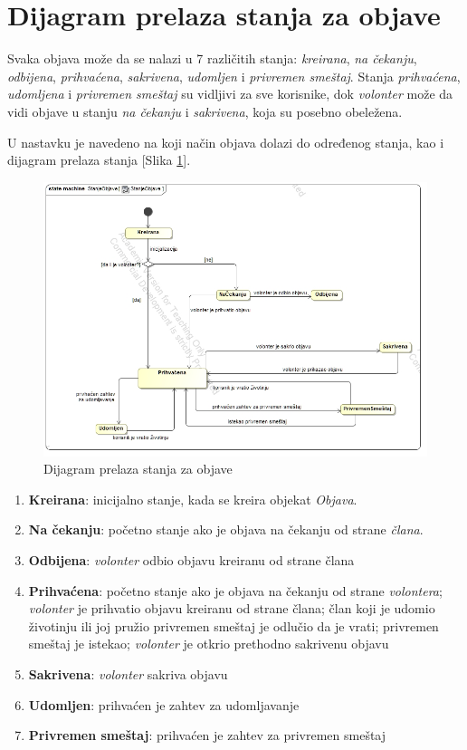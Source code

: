 \section{Dijagram prelaza stanja za objave}
\par Svaka objava može da se nalazi u 7 različitih stanja: \textit{kreirana}, \textit{na čekanju}, \textit{odbijena},
\textit{prihvaćena}, \textit{sakrivena}, \textit{udomljen} i \textit{privremen smeštaj}. 
Stanja \textit{prihvaćena}, \textit{udomljena} i \textit{privremen smeštaj} su vidljivi za sve korisnike,
dok \textit{volonter} može da vidi objave u stanju \textit{na čekanju} i \textit{sakrivena}, koja su posebno obeležena.
\par U nastavku je navedeno na koji način objava dolazi do određenog stanja, kao i dijagram prelaza stanja [Slika \ref{fig:state}].
\begin{figure}[h]
    \centering
    \includegraphics[width=\textwidth]{img/state.jpg}
    \caption{Dijagram prelaza stanja za objave}
    \label{fig:state}
\end{figure}
\begin{enumerate}
    \item \textbf{Kreirana}: inicijalno stanje, kada se kreira objekat \textit{Objava}.
    \item \textbf{Na čekanju}: početno stanje ako je objava na čekanju od strane \textit{člana}.
    \item \textbf{Odbijena}: \textit{volonter} odbio objavu kreiranu od strane člana
    \item \textbf{Prihvaćena}: 
        početno stanje ako je objava na čekanju od strane \textit{volontera}; 
        \textit{volonter} je prihvatio objavu kreiranu od strane člana;
        član koji je udomio životinju ili joj pružio privremen smeštaj je odlučio da je vrati;
        privremen smeštaj je istekao;
        \textit{volonter} je otkrio prethodno sakrivenu objavu
    \item \textbf{Sakrivena}: \textit{volonter} sakriva objavu
    \item \textbf{Udomljen}: prihvaćen je zahtev za udomljavanje
    \item \textbf{Privremen smeštaj}: prihvaćen je zahtev za privremen smeštaj
\end{enumerate}
